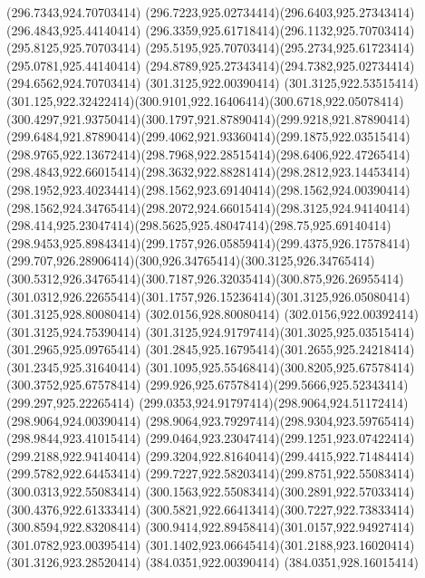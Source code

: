 {{	\closepath
	\moveto(296.7343,924.70703414)
	\curveto(296.7223,925.02734414)(296.6403,925.27343414)(296.4843,925.44140414)
	\curveto(296.3359,925.61718414)(296.1132,925.70703414)(295.8125,925.70703414)
	\curveto(295.5195,925.70703414)(295.2734,925.61723414)(295.0781,925.44140414)
	\curveto(294.8789,925.27343414)(294.7382,925.02734414)(294.6562,924.70703414)
	\closepath
	\moveto(301.3125,922.00390414)
	\lineto(301.3125,922.53515414)
	\curveto(301.125,922.32422414)(300.9101,922.16406414)(300.6718,922.05078414)
	\curveto(300.4297,921.93750414)(300.1797,921.87890414)(299.9218,921.87890414)
	\curveto(299.6484,921.87890414)(299.4062,921.93360414)(299.1875,922.03515414)
	\curveto(298.9765,922.13672414)(298.7968,922.28515414)(298.6406,922.47265414)
	\curveto(298.4843,922.66015414)(298.3632,922.88281414)(298.2812,923.14453414)
	\curveto(298.1952,923.40234414)(298.1562,923.69140414)(298.1562,924.00390414)
	\curveto(298.1562,924.34765414)(298.2072,924.66015414)(298.3125,924.94140414)
	\curveto(298.414,925.23047414)(298.5625,925.48047414)(298.75,925.69140414)
	\curveto(298.9453,925.89843414)(299.1757,926.05859414)(299.4375,926.17578414)
	\curveto(299.707,926.28906414)(300,926.34765414)(300.3125,926.34765414)
	\curveto(300.5312,926.34765414)(300.7187,926.32035414)(300.875,926.26955414)
	\curveto(301.0312,926.22655414)(301.1757,926.15236414)(301.3125,926.05080414)
	\lineto(301.3125,928.80080414)
	\lineto(302.0156,928.80080414)
	\lineto(302.0156,922.00392414)
	\closepath
	\moveto(301.3125,924.75390414)
	\curveto(301.3125,924.91797414)(301.3025,925.03515414)(301.2965,925.09765414)
	\curveto(301.2845,925.16795414)(301.2655,925.24218414)(301.2345,925.31640414)
	\curveto(301.1095,925.55468414)(300.8205,925.67578414)(300.3752,925.67578414)
	\curveto(299.926,925.67578414)(299.5666,925.52343414)(299.297,925.22265414)
	\curveto(299.0353,924.91797414)(298.9064,924.51172414)(298.9064,924.00390414)
	\curveto(298.9064,923.79297414)(298.9304,923.59765414)(298.9844,923.41015414)
	\curveto(299.0464,923.23047414)(299.1251,923.07422414)(299.2188,922.94140414)
	\curveto(299.3204,922.81640414)(299.4415,922.71484414)(299.5782,922.64453414)
	\curveto(299.7227,922.58203414)(299.8751,922.55083414)(300.0313,922.55083414)
	\curveto(300.1563,922.55083414)(300.2891,922.57033414)(300.4376,922.61333414)
	\curveto(300.5821,922.66413414)(300.7227,922.73833414)(300.8594,922.83208414)
	\curveto(300.9414,922.89458414)(301.0157,922.94927414)(301.0782,923.00395414)
	\curveto(301.1402,923.06645414)(301.2188,923.16020414)(301.3126,923.28520414)
	\closepath
	\moveto(384.0351,922.00390414)
	\lineto(384.0351,928.16015414)
}}
